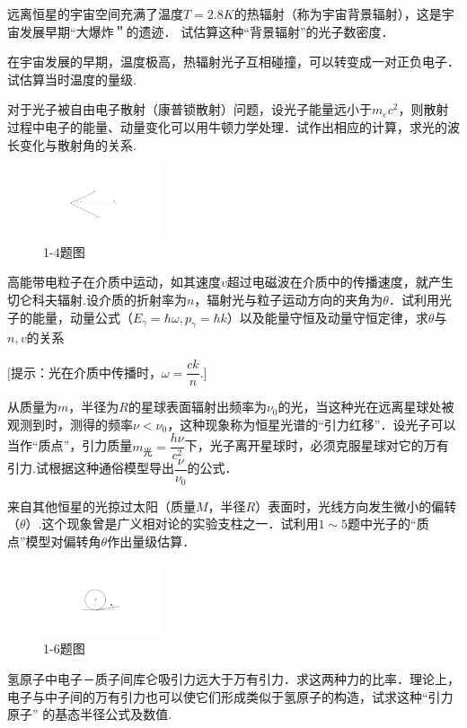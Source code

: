 \begin{exercises}

\exercise 远离恒星的宇宙空间充满了温度$T=2.8\si{K}$的热辐射（称为宇宙背景辐射），这是宇宙发展早期“大爆炸＂的遗迹． 试估算这种“背景辐射”的光子数密度．

\exercise 在宇宙发展的早期，温度极高，热辐射光子互相碰撞，可以转变成一对正负电子．试估算当时温度的量级.

\exercise 对于光子被自由电子散射（康普锁散射）问题，设光子能量远小于$m_{e}c^{2}$，则散射过程中电子的能量、动量变化可以用牛顿力学处理．试作出相应的计算，求光的波长变化与散射角的关系.

\begin{figure}
	\centering
	\includegraphics[width=3.5cm,clip]{QM file/figure/1-9}
	\caption{1-4题图}
	\label{fig.1-9}
\end{figure}
\exercise 高能带电粒子在介质中运动，如其速度$v$超过电磁波在介质中的传播速度，就产生切仑科夫辐射.设介质的折射率为$n$，辐射光与粒子运动方向的夹角为$\theta$．试利用光子的能量，动量公式（$E_{\gamma}=\hbar\omega,p_{\gamma}=\hbar k$）以及能量守恒及动量守恒定律，求$\theta$与$n,v$的关系

$\big[\text{提示：光在介质中传播时，}\omega=\dfrac{ck}{n}. \big]$

\exercise 从质量为$m$，半径为$R$的星球表面辐射出频率为$\nu_{0}$的光，当这种光在远离星球处被观测到时，测得的频率$\nu<\nu_{0}$，这种现象称为恒星光谱的“引力红移”．设光子可以当作“质点”，引力质量$m_{\text{光}}=\dfrac{h\nu}{c^{2}}$下，光子离开星球时，必须克服星球对它的万有引力.试根据这种通俗模型导出$\dfrac{\nu}{\nu_{0}}$的公式．

\exercise 来自其他恒星的光掠过太阳（质量$M$，半径$R$）表面时，光线方向发生微小的偏转（$\theta$）.这个现象曾是广义相对论的实验支柱之一．试利用$1\sim 5$题中光子的“质点”模型对偏转角$\theta$作出量级估算．
\begin{figure}[!h]
	\centering
	\includegraphics[width=3.5cm,clip]{QM file/figure/1-10}
	\caption{1-6题图}	\label{fig.1-10}
\end{figure}
\exercise 氢原子中电子－质子间库仑吸引力远大于万有引力．求这两种力的比率．理论上，电子与中子间的万有引力也可以使它们形成类似于氢原子的构造，试求这种“引力原子” 的基态半径公式及数值.


\end{exercises}
